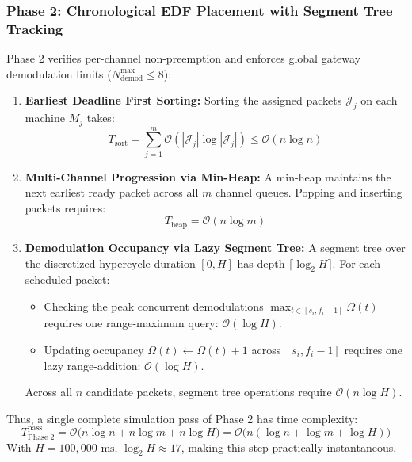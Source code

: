 \documentclass{article}
\begin{document}
\subsubsection{Phase 2: Chronological EDF Placement with Segment Tree Tracking}
Phase 2 verifies per-channel non-preemption and enforces global gateway demodulation limits ($N_{\text{demod}}^{\max} \le 8$):
\begin{enumerate}
    \item \textbf{Earliest Deadline First Sorting:} Sorting the assigned packets $\mathcal{J}_j$ on each machine $M_j$ takes:
    \begin{equation}
    T_{\text{sort}} = \sum_{j=1}^m \mathcal{O}(|\mathcal{J}_j| \log |\mathcal{J}_j|) \le \mathcal{O}(n \log n)
    \end{equation}
    \item \textbf{Multi-Channel Progression via Min-Heap:} A min-heap maintains the next earliest ready packet across all $m$ channel queues. Popping and inserting packets requires:
    \begin{equation}
    T_{\text{heap}} = \mathcal{O}(n \log m)
    \end{equation}
    \item \textbf{Demodulation Occupancy via Lazy Segment Tree:} A segment tree over the discretized hypercycle duration $[0, H]$ has depth $\lceil \log_2 H \rceil$. For each scheduled packet:
    \begin{itemize}
        \item Checking the peak concurrent demodulations $\max_{t \in [s_i, f_i-1]} \Omega(t)$ requires one range-maximum query: $\mathcal{O}(\log H)$.
        \item Updating occupancy $\Omega(t) \leftarrow \Omega(t) + 1$ across $[s_i, f_i-1]$ requires one lazy range-addition: $\mathcal{O}(\log H)$.
    \end{itemize}
    Across all $n$ candidate packets, segment tree operations require $\mathcal{O}(n \log H)$.
\end{enumerate}

Thus, a single complete simulation pass of Phase 2 has time complexity:
\begin{equation}
\label{eq:phase2_complexity}
T_{\text{Phase 2}}^{\text{pass}} = \mathcal{O}\Big(n \log n + n \log m + n \log H\Big) = \mathcal{O}\Big(n (\log n + \log m + \log H)\Big)
\end{equation}
With $H = 100{,}000\text{ ms}$, $\log_2 H \approx 17$, making this step practically instantaneous.
\end{document}
